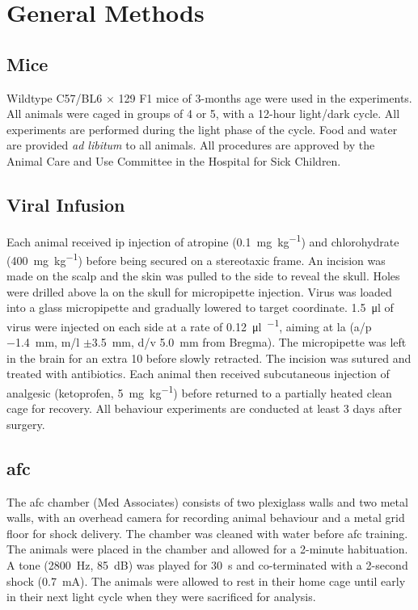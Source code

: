 \chapter{General Methods}

\section{Mice}

Wildtype C57/BL6 $\times$ 129 F1 mice of 3-months age were used in the experiments. All animals were caged in groups of 4 or 5, with a 12-hour light/dark cycle. All experiments are performed during the light phase of the cycle. Food and water are provided \textit{ad libitum} to all animals. All procedures are approved by the Animal Care and Use Committee in the Hospital for Sick Children.

\section{Viral Infusion}\label{methods.viralinfusion}

Each animal received \gls{ip} injection of atropine (\SI{0.1}{\mg\per\kg}) and chlorohydrate (\SI{400}{\mg\per\kg}) before being secured on a stereotaxic frame. An incision was made on the scalp and the skin was pulled to the side to reveal the skull. Holes were drilled above \gls{la} on the skull for micropipette injection. Virus was loaded into a glass micropipette and gradually lowered to target coordinate. \SI{1.5}{\ul} of virus were injected on each side at a rate of \SI{0.12}{\ul\per\min}, aiming at \gls{la} (\gls{a/p} \SI{-1.4}{\mm}, \gls{m/l} $\pm$\SI{3.5}{\mm}, \gls{d/v} \SI{5.0}{\mm} from Bregma). The micropipette was left in the brain for an extra \si{10}{\min} before slowly retracted. The incision was sutured and treated with antibiotics. Each animal then received subcutaneous injection of analgesic (ketoprofen, \SI{5}{\mg\per\kg}) before returned to a partially heated clean cage for recovery. All behaviour experiments are conducted at least 3 days after surgery.


\section{\Acrlong{afc}}

The \gls{afc} chamber (Med Associates) consists of two plexiglass walls and two metal walls, with an overhead camera for recording animal behaviour and a metal grid floor for shock delivery. The chamber was cleaned with water before \gls{afc} training. The animals were placed in the chamber and allowed for a 2-minute habituation. A tone (\SI{2800}{\Hz}, \SI{85}{\dB}) was played for \SI{30}{\second} and co-terminated with a 2-second shock (\SI{0.7}{\mA}). The animals were allowed to rest in their home cage until early in their next light cycle when they were sacrificed for analysis. 
